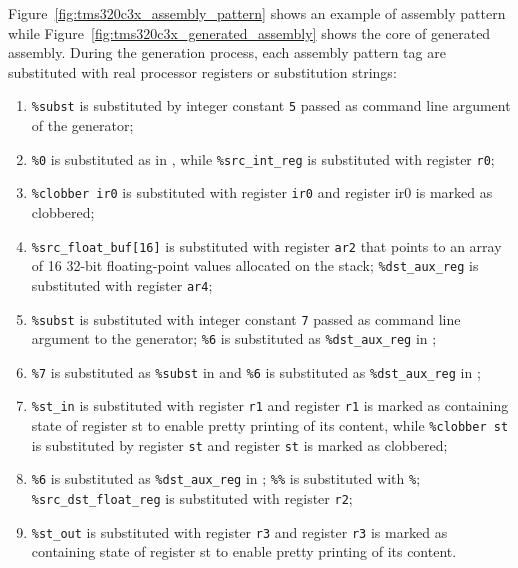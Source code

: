 Figure~\ref{fig:tms320c3x_assembly_pattern} shows an example of assembly pattern while Figure~\ref{fig:tms320c3x_generated_assembly} shows the core of generated assembly. During the generation process, each assembly pattern tag are substituted with real processor registers or substitution strings:
\begin{enumerate}
\item[{\large \ding{202}}] \texttt{\%subst} is substituted by integer constant \texttt{5} passed as command line argument of the generator;
\item[{\large \ding{203}}] \texttt{\%0} is substituted as in {\large {}}, while \texttt{\%src\_int\_reg} is substituted with register \texttt{r0};
\item[{\large \ding{204}}] \texttt{\%clobber ir0} is substituted with register \texttt{ir0} and register ir0 is marked as clobbered;
\item[{\large \ding{205}}] \texttt{\%src\_float\_buf[16]} is substituted with register \texttt{ar2} that points to an array of 16 32-bit floating-point values allocated on the stack; \texttt{\%dst\_aux\_reg} is substituted with register \texttt{ar4};
\item[{\large \ding{206}}] \texttt{\%subst} is substituted with integer constant \texttt{7} passed as command line argument to the generator; \texttt{\%6} is substituted as \texttt{\%dst\_aux\_reg} in {\large {}};
\item[{\large \ding{207}}] \texttt{\%7} is substituted as \texttt{\%subst} in {\large {}} and \texttt{\%6} is substituted as \texttt{\%dst\_aux\_reg} in {\large {}};
\item[{\large \ding{208}}] \texttt{\%st\_in} is substituted with register \texttt{r1} and register \texttt{r1} is marked as containing state of register st to enable pretty printing of its content, while \texttt{\%clobber st} is substituted by register \texttt{st} and register \texttt{st} is marked as clobbered;
\item[{\large \ding{209}}] \texttt{\%6} is substituted as \texttt{\%dst\_aux\_reg} in {\large {}}; \texttt{\%\%} is substituted with \texttt{\%}; \texttt{\%src\_dst\_float\_reg} is substituted with register \texttt{r2};
\item[{\large \ding{210}}] \texttt{\%st\_out} is substituted with register \texttt{r3} and register \texttt{r3} is marked as containing state of register st to enable pretty printing of its content.
\end{enumerate}

